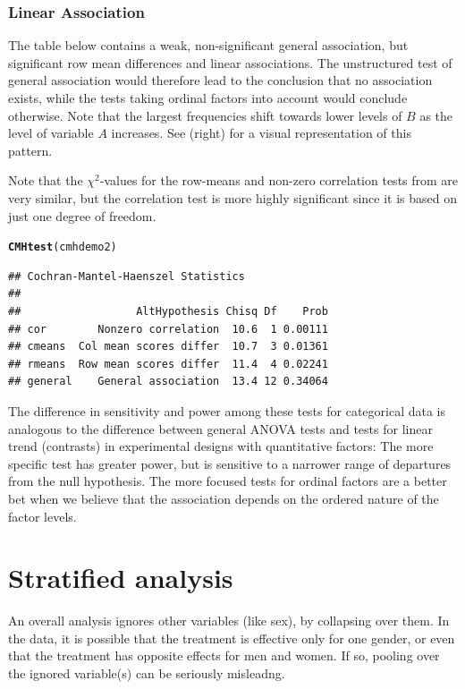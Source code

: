 \documentclass[11pt]{book}\usepackage[]{graphicx}\usepackage[]{color}
\makeatletter
\newcommand{\hlstd}[1]{\textcolor[rgb]{0.345,0.345,0.345}{#1}}%
\newcommand{\hlkwd}[1]{\textcolor[rgb]{0.737,0.353,0.396}{\textbf{#1}}}%
\newenvironment{kframe}{%
 \def\at@end@of@kframe{}%
 \ifinner\ifhmode%
  \def\at@end@of@kframe{\end{minipage}}%
  \begin{minipage}{\columnwidth}%
 \fi\fi%
 \def\FrameCommand##1{\hskip\@totalleftmargin \hskip-\fboxsep
 \colorbox{shadecolor}{##1}\hskip-\fboxsep
     \hskip-\linewidth \hskip-\@totalleftmargin \hskip\columnwidth}%
 \MakeFramed {\advance\hsize-\width
   \@totalleftmargin\z@ \linewidth\hsize
   \@setminipage}}%
 {\par\unskip\endMakeFramed%
 \at@end@of@kframe}
\newenvironment{knitrout}{}{} %
\renewenvironment{knitrout}{\small\renewcommand{\baselinestretch}{.85}}{} %
\makeatother
\begin{document}
\subsubsection{Linear Association}

The table below contains a weak,
non-significant general association, but significant row mean
differences and linear associations.
The unstructured test of general association would therefore
lead to the conclusion that no association exists, while the
tests taking ordinal factors into account would conclude otherwise.
Note that the largest frequencies
shift towards lower levels of $B$ as the level of variable $A$ increases.
See (right) for a visual representation of this pattern.



Note that the \(\chi^2\)-values for the row-means and non-zero
correlation tests from 
are very similar, but the correlation test is more
highly significant since it is based on just one degree of
freedom.
\begin{knitrout}
\color{fgcolor}\begin{kframe}
\begin{alltt}
\hlkwd{CMHtest}\hlstd{(cmhdemo2)}
\end{alltt}
\begin{verbatim}
## Cochran-Mantel-Haenszel Statistics 
## 
##                  AltHypothesis Chisq Df    Prob
## cor        Nonzero correlation  10.6  1 0.00111
## cmeans  Col mean scores differ  10.7  3 0.01361
## rmeans  Row mean scores differ  11.4  4 0.02241
## general    General association  13.4 12 0.34064
\end{verbatim}
\end{kframe}
\end{knitrout}

The difference in sensitivity and power among these tests 
for categorical data is
analogous to the difference between general ANOVA tests and tests for
linear trend (contrasts)
in experimental designs with quantitative factors:
The more specific test has greater power, but is sensitive to
a narrower range of departures from the null hypothesis.
The more focused tests for ordinal factors are a better bet
when we believe that the association depends on the ordered
nature of the factor levels.

\section{Stratified analysis}\label{sec:twoway-strat}
An overall analysis ignores other variables (like sex), by
collapsing over them.  In the  data,
it is possible that the treatment is effective
only for one gender, or even that the treatment has opposite effects
for men and women.  If so, pooling over the ignored variable(s)
can be seriously misleadng.
\end{document}
